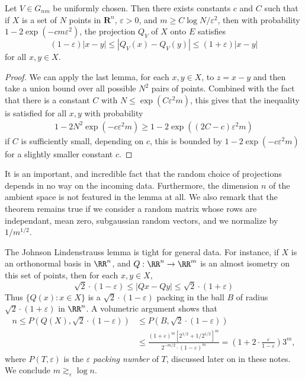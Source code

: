 \begin{theorem}
    Let $V \in G_{nm}$ be uniformly chosen. Then there exists constants $c$ and $C$ such that if $X$ is a set of $N$ points in $\mathbf{R}^n$, $\varepsilon > 0$, and $m \geq C \log N / \varepsilon^2$, then with probability $1 - 2 \exp(-c m \varepsilon^2)$, the projection $Q_V$ of $X$ onto $E$ satisfies
    \[ (1 - \varepsilon)|x-y| \leq | Q_V(x) - Q_V(y) | \leq (1 + \varepsilon) |x - y| \]
    for all $x,y \in X$.
\end{theorem}
\begin{proof}
    We can apply the last lemma, for each $x,y \in X$, to $z = x-y$ and then take a union bound over all possible $N^2$ pairs of points. Combined with the fact that there is a constant $C$ with $N \leq \exp(C \varepsilon^2 m)$, this gives that the inequality is satisfied for all $x,y$ with probability
    \begin{align*}
        1 - 2 N^2 \exp(-c \varepsilon^2 m) \geq 1 - 2 \exp((2C - c) \varepsilon^2 m)
    \end{align*}
    if $C$ is sufficiently small, depending on $c$, this is bounded by $1 - 2 \exp(-c\varepsilon^2 m)$ for a slightly smaller constant $c$.
\end{proof}

\begin{remark}
    It is an important, and incredible fact that the random choice of projections depends in no way on the incoming data. Furthermore, the dimension $n$ of the ambient space is not featured in the lemma at all. We also remark that the theorem remains true if we consider a random matrix whose rows are independant, mean zero, subgaussian random vectors, and we normalize by $1/m^{1/2}$.
\end{remark}

The Johnson Lindenstrauss lemma is tight for general data. For instance, if $X$ is an orthonormal basis in $\RR^n$, and $Q: \RR^n \to \RR^m$ is an almost isometry on this set of points, then for each $x,y \in X$,
%
\[ \sqrt{2} \cdot (1 - \varepsilon) \leq |Qx - Qy| \leq \sqrt{2} \cdot (1 + \varepsilon)  \]
%
Thus $\{ Q(x): x \in X \}$ is a $\sqrt{2} \cdot (1 - \varepsilon)$ packing in the ball $B$ of radius $\sqrt{2} \cdot (1 + \varepsilon)$ in $\RR^n$. A volumetric argument shows that
%
\begin{align*}
	n \leq P(Q(X), \sqrt{2} \cdot (1 - \varepsilon)) &\leq P \left( B, \sqrt{2} \cdot (1 - \varepsilon) \right)\\
	&\leq \frac{(1 + \varepsilon)^m [2^{1/2} + 1/2^{1/2}]^m}{2^{-m/2} \cdot (1 - \varepsilon)^m} = \left( 1 + 2 \cdot \frac{\varepsilon}{1 - \varepsilon} \right) 3^m,
\end{align*}
%
where $P(T,\varepsilon)$ is the $\varepsilon$ \emph{packing number} of $T$, discussed later on in these notes. We conclude $m \gtrsim_\varepsilon \log n$.










